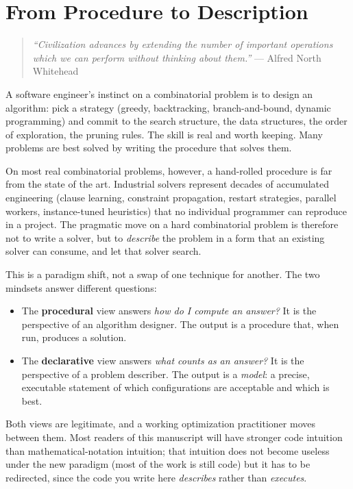 \chapter{From Procedure to Description}\label{chap:1}

\begin{quote}
\emph{``Civilization advances by extending the number of important
operations which we can perform without thinking about them.''} ---
Alfred North Whitehead
\end{quote}

A software engineer's instinct on a combinatorial problem is to design
an algorithm: pick a strategy (greedy, backtracking, branch-and-bound,
dynamic programming) and commit to the search structure, the data
structures, the order of exploration, the pruning rules. The skill is
real and worth keeping. Many problems are best solved by writing the
procedure that solves them.

On most real combinatorial problems, however, a hand-rolled procedure is
far from the state of the art. Industrial solvers represent decades of
accumulated engineering (clause learning, constraint propagation,
restart strategies, parallel workers, instance-tuned heuristics) that
no individual programmer can reproduce in a project. The pragmatic move
on a hard combinatorial problem is therefore not to write a solver, but
to \emph{describe} the problem in a form that an existing solver can
consume, and let that solver search.

This is a paradigm shift, not a swap of one technique for another. The
two mindsets answer different questions:

\begin{itemize}
\item
  The \textbf{procedural} view answers \emph{how do I compute an
  answer?} It is the perspective of an algorithm designer. The output is
  a procedure that, when run, produces a solution.
\item
  The \textbf{declarative} view answers \emph{what counts as an answer?}
  It is the perspective of a problem describer. The output is a
  \emph{model}: a precise, executable statement of which
  configurations are acceptable and which is best.
\end{itemize}

Both views are legitimate, and a working optimization practitioner moves
between them. Most readers of this manuscript will have stronger code
intuition than mathematical-notation intuition; that intuition does not
become useless under the new paradigm (most of the work is still code)
but it has to be redirected, since the code you write here
\emph{describes} rather than \emph{executes}.

